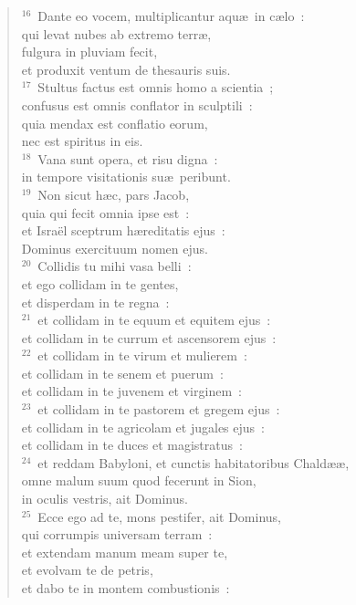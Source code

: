 \begin{verse}
${}^{16}$~Dante eo vocem, multiplicantur aqu\ae\ in c\ae lo~:\\ qui levat nubes ab extremo terr\ae ,\\ fulgura in pluviam fecit,\\ et produxit ventum de thesauris suis.\\
${}^{17}$~Stultus factus est omnis homo a scientia~;\\ confusus est omnis conflator in sculptili~:\\ quia mendax est conflatio eorum,\\ nec est spiritus in eis.\\
${}^{18}$~Vana sunt opera, et risu digna~:\\ in tempore visitationis su\ae\ peribunt.\\
${}^{19}$~Non sicut h\ae c, pars Jacob,\\ quia qui fecit omnia ipse est~:\\ et Isra\"el sceptrum h\ae reditatis ejus~:\\ Dominus exercituum nomen ejus.\\
${}^{20}$~Collidis tu mihi vasa belli~:\\ et ego collidam in te gentes,\\ et disperdam in te regna~:\\
${}^{21}$~et collidam in te equum et equitem ejus~:\\ et collidam in te currum et ascensorem ejus~:\\
${}^{22}$~et collidam in te virum et mulierem~:\\ et collidam in te senem et puerum~:\\ et collidam in te juvenem et virginem~:\\
${}^{23}$~et collidam in te pastorem et gregem ejus~:\\ et collidam in te agricolam et jugales ejus~:\\ et collidam in te duces et magistratus~:\\
${}^{24}$~et reddam Babyloni, et cunctis habitatoribus Chald\ae \ae ,\\ omne malum suum quod fecerunt in Sion,\\ in oculis vestris, ait Dominus.\\
${}^{25}$~Ecce ego ad te, mons pestifer, ait Dominus,\\ qui corrumpis universam terram~:\\ et extendam manum meam super te,\\ et evolvam te de petris,\\ et dabo te in montem combustionis~:\\

\end{verse}
